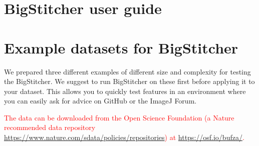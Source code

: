 \documentclass[]{spie}  %
\begin{document}
\begin{landscape}
\begin{figure}[h!]
{}
\label{tab:benchmarks}
\end{figure}

\end{landscape}
\pagebreak





\section{BigStitcher user guide}
\label{sec:documentation}




\section{Example datasets for BigStitcher}
\label{sec:example}

We prepared three different examples of different size and complexity for testing the BigStitcher. We suggest to run BigStitcher on these first before applying it to your dataset. This allows you to quickly test features in an environment where you can easily ask for advice on GitHub or the ImageJ Forum.

\textcolor{red}{The data can be downloaded from the Open Science Foundation (a Nature recommended data repository \url{https://www.nature.com/sdata/policies/repositories}) at \url{https://osf.io/bufza/}.}
\end{document}

